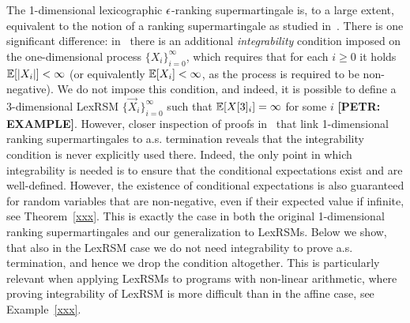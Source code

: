 The 1-dimensional lexicographic $\epsilon$-ranking supermartingale is, to a large extent, equivalent to the notion of a ranking supermartingale as studied in~\cite{xxx}. There is one significant difference: in~\cite{xxx} there is an additional \emph{integrability} condition imposed on the one-dimensional process $\{X_i\}_{i=0}^{\infty}$, which requires that for each $i\geq 0$ it holds $\mathbb{E}[|X_i|]<\infty$ (or equivalently $\mathbb{E}[X_i]<\infty$, as the process is required to be non-negative). We do not impose this condition, and indeed, it is possible to define a 3-dimensional LexRSM $\{\vec{X}_{i}\}_{i=0}^{\infty}$ such that $\mathbb{E}[X[3]_i]=\infty$ for some $i$ \textbf{[PETR: EXAMPLE]}. However, closer inspection of proofs in~\cite{xxx} that link 1-dimensional ranking supermartingales to a.s. termination reveals that the integrability condition is never explicitly used there. Indeed, the only point in which integrability is needed is to ensure that the conditional expectations exist and are well-defined. However, the existence of conditional expectations is also guaranteed for random variables that are non-negative, even if their expected value if infinite, see Theorem~\ref{xxx}. This is exactly the case in both the original 1-dimensional ranking supermartingales and our generalization to LexRSMs. Below we show, that also in the LexRSM case we do not need integrability to prove a.s. termination, and hence we drop the condition altogether. This is particularly relevant when applying LexRSMs to programs with non-linear arithmetic, where proving integrability of LexRSM is more difficult than in the affine case, see Example~\ref{xxx}. 

